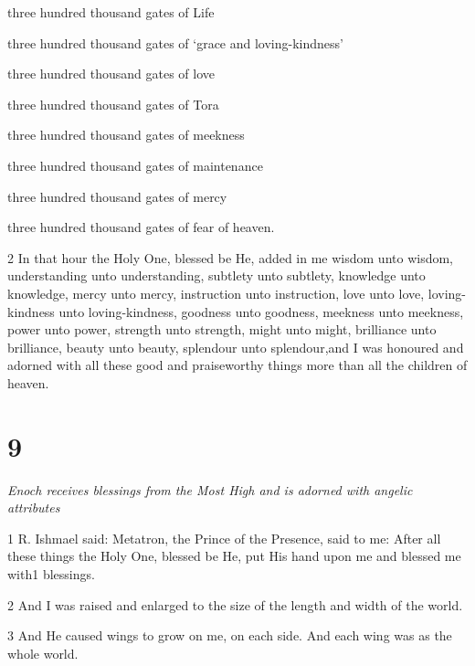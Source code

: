 \par three hundred thousand gates of Life 

\par three hundred thousand gates of ‘grace and loving-kindness’

\par three hundred thousand gates of love 

\par three hundred thousand gates of Tora 

\par three hundred thousand gates of meekness 

\par three hundred thousand gates of maintenance 

\par three hundred thousand gates of mercy 

\par three hundred thousand gates of fear of heaven. 

\par 2 In that hour the Holy One, blessed be He, added in me wisdom unto wisdom, understanding unto understanding, subtlety unto subtlety, knowledge unto knowledge, mercy unto mercy, instruction unto instruction, love unto love, loving-kindness unto loving-kindness, goodness unto goodness, meekness unto meekness, power unto power, strength unto strength, might unto might, brilliance unto brilliance, beauty unto beauty, splendour unto splendour,and I was honoured and adorned with all these good and praiseworthy things more than all the children of heaven. 


\chapter{9}

\par \textit{Enoch receives blessings from the Most High and is adorned with angelic attributes}

\par 1 R. Ishmael said: Metatron, the Prince of the Presence, said to me: After all these things the Holy One, blessed be He, put His hand upon me and blessed me with1 blessings.

\par 2 And I was raised and enlarged to the size of the length and width of the world. 

\par 3 And He caused wings to grow on me, on each side. And each wing was as the whole world.

